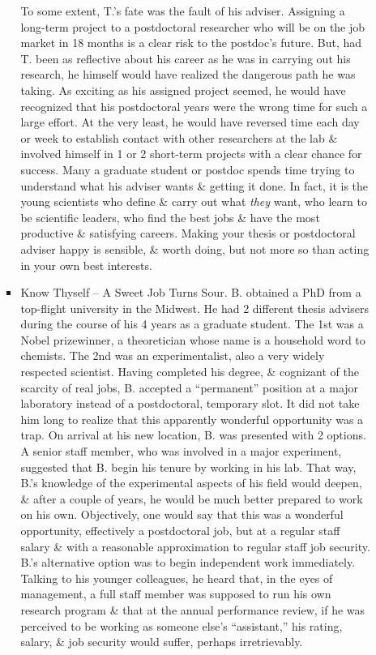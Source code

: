 \documentclass{article}
\begin{document}
\begin{enumerate}
\begin{itemize}
\begin{itemize}
			To some extent, T.'s fate was the fault of his adviser. Assigning a long-term project to a postdoctoral researcher who will be on the job market in 18 months is a clear risk to the postdoc's future. But, had T. been as reflective about his career as he was in carrying out his research, he himself would have realized the dangerous path he was taking. As exciting as his assigned project seemed, he would have recognized that his postdoctoral years were the wrong time for such a large effort. At the very least, he would have reversed time each day or week to establish contact with other researchers at the lab \& involved himself in 1 or 2 short-term projects with a clear chance for success. Many a graduate student or postdoc spends time trying to understand what his adviser wants \& getting it done. In fact, it is the young scientists who define \& carry out what {\it they} want, who learn to be scientific leaders, who find the best jobs \& have the most productive \& satisfying careers. Making your thesis or postdoctoral adviser happy is sensible, \& worth doing, but not more so than acting in your own best interests.
			\item {\sf Know Thyself -- A Sweet Job Turns Sour.} B. obtained a PhD from a top-ﬂight university in the Midwest. He had 2 different thesis advisers during the course of his 4 years as a graduate student. The 1st was a Nobel prizewinner, a theoretician whose name is a household word to chemists. The 2nd was an experimentalist, also a very widely respected scientist. Having completed his degree, \& cognizant of the scarcity of real jobs, B. accepted a ``permanent'' position at a major laboratory instead of a postdoctoral, temporary slot. It did not take him long to realize that this apparently wonderful opportunity was a trap. On arrival at his new location, B. was presented with 2 options. A senior staff member, who was involved in a major experiment, suggested that B. begin his tenure by working in his lab. That way, B.'s knowledge of the experimental aspects of his field would deepen, \& after a couple of years, he would be much better prepared to work on his own. Objectively, one would say that this was a wonderful opportunity, effectively a postdoctoral job, but at a regular staff salary \& with a reasonable approximation to regular staff job security. B.'s alternative option was to begin independent work immediately. Talking to his younger colleagues, he heard that, in the eyes of management, a full staff member was supposed to run his own research program \& that at the annual performance review, if he was perceived to be working as someone else's ``assistant,'' his rating, salary, \& job security would suffer, perhaps irretrievably.
			

\end{itemize}
\end{itemize}
\end{enumerate}
\end{document}
